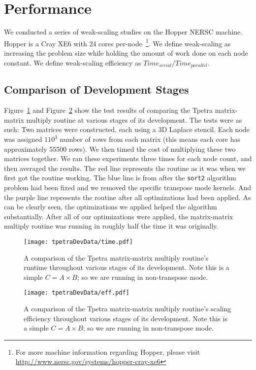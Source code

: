 \documentclass[pdf,12pt]{SANDreport}
\begin{document}
\section{Performance}
\label{perfSect}
We conducted a series of weak-scaling studies on the Hopper NERSC machine. Hopper is a Cray XE6 with 24 cores
per-node~\footnote{For more machine information regarding Hopper, please visit 
\url{http://www.nersc.gov/systems/hopper-cray-xe6}}. We define weak-scaling as increasing the problem size while holding 
the amount of work done on each node constant. We define weak-scaling efficiency as $Time_{serial}/Time_{parallel}$.

\subsection{Comparison of Development Stages}
Figure~\ref{tpetracomptime} and Figure~\ref{tpetracompeff} show the test results of comparing the Tpetra matrix-matrix 
multiply routine at various stages of its 
development. The tests were as such: Two matrices were constructed, each using a 3D Laplace stencil. Each node was assigned 
$110^3$ number of rows from each matrix (this means each core has approximately 55500 rows). 
We then timed the cost of multiplying these two matrices together. We ran these experiments three times for each node 
count, and then averaged the results. The red line represents the routine as it was when we first got the routine working. 
The blue line is from after the \verb!sort2! algorithm problem had been fixed and we removed the specific transpose mode 
kernels. And the purple line represents the routine after all optimizations had been applied.
As can be clearly seen, the optimizations we applied helped the algorithm substantially. After all of our optimizations 
were applied, the matrix-matrix multiply routine was running in roughly half the time it was originally.

\begin{figure}
\centering
\texttt{[image: tpetraDevData/time.pdf]}
\caption[Tpetra Development Time Comparison]{A comparison of the Tpetra matrix-matrix multiply routine's runtime 
throughout various stages of its development. Note this is a simple $C=A \times B$; so we are running in non-transpose mode.}
\label{tpetracomptime}
\end{figure}

\begin{figure}
\centering
\texttt{[image: tpetraDevData/eff.pdf]}
\caption[Tpetra Development Efficiency Comparison]{A comparison of the Tpetra matrix-matrix multiply routine's scaling efficiency
throughout various stages of its development. Note this is a simple $C=A \times B$; so we are running in non-transpose mode.}
\label{tpetracompeff}
\end{figure}
\end{document}
